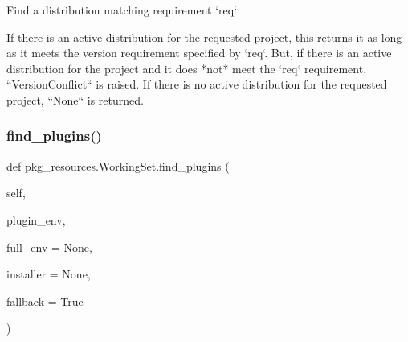 \begin{DoxyVerb}Find a distribution matching requirement `req`

If there is an active distribution for the requested project, this
returns it as long as it meets the version requirement specified by
`req`.  But, if there is an active distribution for the project and it
does *not* meet the `req` requirement, ``VersionConflict`` is raised.
If there is no active distribution for the requested project, ``None``
is returned.
\end{DoxyVerb}
 \mbox{\label{classpkg__resources_1_1_working_set_a5a8cbb91286691870d04edd6c841197d}} 
\subsubsection{\texorpdfstring{find\+\_\+plugins()}{find\_plugins()}}
{\footnotesize\ttfamily def pkg\+\_\+resources.\+Working\+Set.\+find\+\_\+plugins (\begin{DoxyParamCaption}\item[{}]{self,  }\item[{}]{plugin\+\_\+env,  }\item[{}]{full\+\_\+env = {\ttfamily None},  }\item[{}]{installer = {\ttfamily None},  }\item[{}]{fallback = {\ttfamily True} }\end{DoxyParamCaption})}

